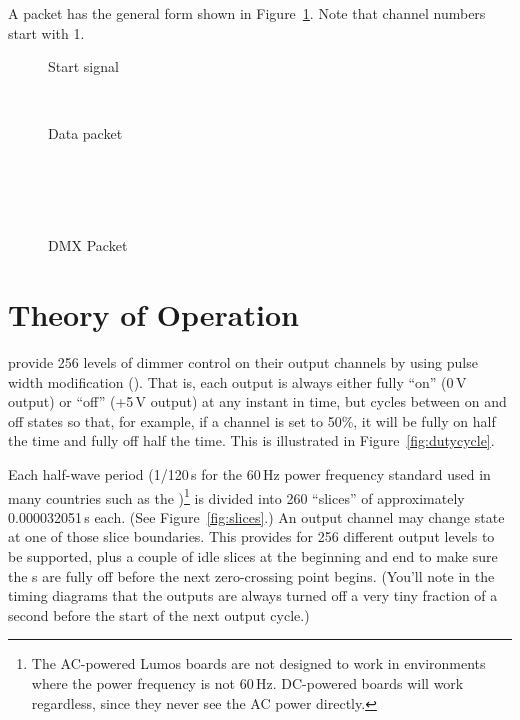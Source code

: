 \documentclass[letterpaper,twoside,onecolumn,openright,final]{memoir}
\begin{document}
A packet has the general form shown in Figure~\ref{fig:dmx}. Note that  
channel numbers start with 1.
\begin{figure}
 \begin{BF}
  \begin{rightwordgroup}{Start signal}
  \\
  \end{rightwordgroup}\\
  \begin{rightwordgroup}{Data packet}
  \\
  \\
  \\
  \\
   \\
  \end{rightwordgroup}
 \end{BF}
 \caption{DMX Packet\label{fig:dmx}}
\end{figure}
\chapter{Theory of Operation}\label{ch:too}
 provide 256 levels of dimmer control on their
output channels by using pulse width modification ().  That is, each output
is always either fully ``on'' (0\,V output) or ``off'' (+5\,V output) at any instant in
time, but cycles between on and off states so that, for example, if a channel is set
to 50\%, it will be fully on half the time and fully off half the time.  This is
illustrated in Figure~\ref{fig:dutycycle}.


Each half-wave period (1/120\,s for the 60\,Hz power frequency standard
used in many countries such as the )\footnote{The AC-powered Lumos boards 
are not designed to work in environments where the power frequency is not 60\,Hz.  DC-powered
boards will work regardless, since they never see the AC power directly.} is divided
into 260 ``slices'' of approximately 0.000032051\,s each.  (See Figure~\ref{fig:slices}.)
An output channel may change
state at one of those slice boundaries.  This provides for 256 different output levels 
to be supported, plus a couple of idle slices at the beginning and end to make 
sure the s are fully off before the next zero-crossing point begins.
(You'll note in the timing diagrams that the outputs are always turned off a very tiny fraction
of a second before the start of the next output cycle.)

\end{document}
